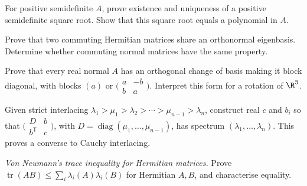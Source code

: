 \begin{exercise}[$\star\star$]\label{linear:ex:sqrtpsd}
For positive semidefinite $A$, prove existence and uniqueness of a positive semidefinite square root. Show that this square root equals a polynomial in $A$.
\end{exercise}
\begin{exercise}[$\star\star$]\label{linear:ex:simultaneous}
Prove that two commuting Hermitian matrices share an orthonormal eigenbasis. Determine whether commuting normal matrices have the same property.
\end{exercise}
\begin{exercise}[$\star\star$]\label{linear:ex:realnormal}
Prove that every real normal $A$ has an orthogonal change of basis making it block diagonal, with blocks $(a)$ or $\bigl(\begin{smallmatrix}a&-b\\b&a\end{smallmatrix}\bigr)$. Interpret this form for a rotation of $\R^3$.
\end{exercise}
\begin{exercise}[$\star\star\star$]\label{linear:ex:bordered}
Given strict interlacing $\lambda_1>\mu_1>\lambda_2>\cdots>\mu_{n-1}>\lambda_n$, construct real $c$ and $b_i$ so that $\bigl(\begin{smallmatrix}D&b\\b^{\mathsf T}&c\end{smallmatrix}\bigr)$, with $D=\operatorname{diag}(\mu_1,\dots,\mu_{n-1})$, has spectrum $(\lambda_1,\dots,\lambda_n)$. This proves a converse to Cauchy interlacing.
\end{exercise}
\begin{exercise}[$\star\star\star$]\label{linear:ex:vonneumann}
\emph{Von Neumann's trace inequality for Hermitian matrices.} Prove $\operatorname{tr}(AB)\le\sum_i\lambda_i(A)\lambda_i(B)$ for Hermitian $A,B$, and characterise equality.
\end{exercise}

